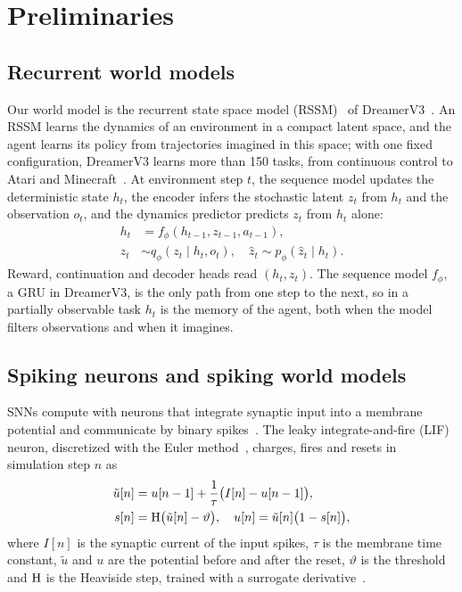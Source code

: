 \section{Preliminaries}
\label{sec:prelim}

\subsection{Recurrent world models}
\label{sec:rssm}

Our world model is the recurrent state space model (RSSM)~\cite{hafner2019planet} of DreamerV3~\cite{hafner2025dreamerv3}.
An RSSM learns the dynamics of an environment in a compact latent space, and the agent learns its policy from trajectories imagined in this space; with one fixed configuration, DreamerV3 learns more than 150 tasks, from continuous control to Atari and Minecraft~\cite{hafner2025dreamerv3}.
At environment step $t$, the sequence model updates the deterministic state $h_t$, the encoder infers the stochastic latent $z_t$ from $h_t$ and the observation $o_t$, and the dynamics predictor predicts $z_t$ from $h_t$ alone:
\begin{equation}
\begin{aligned}
h_t &= f_\phi(h_{t-1}, z_{t-1}, a_{t-1}),\\
z_t &\sim q_\phi(z_t \mid h_t, o_t), \quad \hat z_t \sim p_\phi(\hat z_t \mid h_t).
\end{aligned}
\label{eq:rssm}
\end{equation}
Reward, continuation and decoder heads read $(h_t,z_t)$.
The sequence model $f_\phi$, a GRU in DreamerV3, is the only path from one step to the next, so in a partially observable task $h_t$ is the memory of the agent, both when the model filters observations and when it imagines.

\subsection{Spiking neurons and spiking world models}
\label{sec:swm}

SNNs compute with neurons that integrate synaptic input into a membrane potential and communicate by binary spikes~\cite{maass1997networks}.
The leaky integrate-and-fire (LIF) neuron, discretized with the Euler method~\cite{fang2021plif}, charges, fires and resets in simulation step $n$ as
\begin{equation}
\begin{aligned}
\tilde u[n] &= u[n-1] + \frac{1}{\tau}\big(I[n] - u[n-1]\big),\\
s[n] &= \mathrm{H}\big(\tilde u[n] - \vartheta\big), \quad u[n] = \tilde u[n]\big(1 - s[n]\big),
\end{aligned}
\label{eq:lif}
\end{equation}
where $I[n]$ is the synaptic current of the input spikes, $\tau$ is the membrane time constant, $\tilde u$ and $u$ are the potential before and after the reset, $\vartheta$ is the threshold and $\mathrm{H}$ is the Heaviside step, trained with a surrogate derivative~\cite{neftci2019surrogate,wu2018stbp}.

